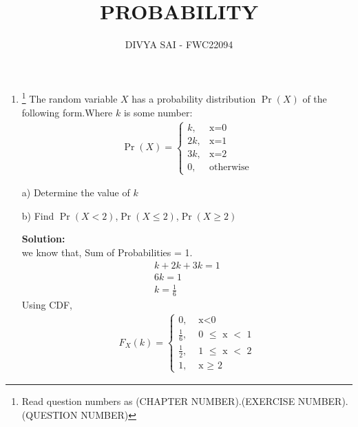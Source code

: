 \documentclass{article}
\providecommand{\pr}[1]{\ensuremath{\Pr\left(#1\right)}}
\newcommand{\solution}{\noindent \textbf{Solution: }}
\begin{document}
\title{PROBABILITY}
\author{\Large DIVYA SAI - FWC22094}
\date{}

\maketitle
\begin{enumerate}
[label=16.\arabic{enumi}.\arabic{enumii}]%
\setcounter{enumi}{3}
\setcounter{enumii}{10}

\item \footnote{Read question numbers as (CHAPTER NUMBER).(EXERCISE NUMBER).(QUESTION NUMBER)} {The random variable $X$ has a probability distribution \pr{X} of the following form.Where $k$ is some number: }
\begin{align}
  \pr{X} =
    \begin{cases}
      k,  & \text{x=0}\\
      2k, & \text{x=1}\\
      3k, & \text{x=2}\\
      0 , & \text{otherwise}
    \end{cases}       
\end{align}

a) Determine the value of $k$ 

b) Find \pr{X < 2},\pr{X \leq 2},\pr{X \geq 2}  


\solution\\
we know that,
Sum of Probabilities = 1.
\begin{align}
&k + 2k + 3k  = 1 &\\
&6k = 1 &\\
&k = \frac{1}{6}&
\end{align}
Using CDF,
\begin{align}
  F_X(k) =
    \begin{cases}
      0,  & \text{ x$<$0}\\
      \frac{1}{6}, & \text{ 0 $\leq$ x $<$ 1}\\
      \frac{1}{2}, & \text{ 1 $\leq$ x $<$ 2}\\
      1 , & \text{ x $\geq$ 2}
    \end{cases}       
\end{align}


\end{enumerate}
\end{document}
